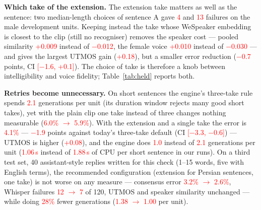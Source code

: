 \documentclass[conference]{IEEEtran}
\newcommand{\RES}[1]{\textcolor{red}{#1}}
\begin{document}
\textbf{Which take of the extension.} The extension take matters as well as the sentence: two
median-length choices of sentence A gave \RES{4} and \RES{13} failures on the male development units. Keeping
instead the take whose WeSpeaker embedding is closest to the clip (still no recogniser) removes the speaker
cost --- pooled similarity \RES{+0.009} instead of \RES{$-$0.012}, the female voice \RES{+0.010} instead of
\RES{$-$0.030} --- and gives the largest UTMOS gain (\RES{+0.18}), but a smaller error reduction
(\RES{$-$0.7} points, CI \RES{[$-$1.6, +0.1]}). The choice of take is therefore a knob between intelligibility
and voice fidelity; Table~\ref{tab:held} reports both.

\textbf{Retries become unnecessary.} On short sentences the engine's three-take rule spends \RES{2.1}
generations per unit (its duration window rejects many good short takes), yet with the plain clip one take
instead of three changes nothing measurable (\RES{6.0\% $\to$ 5.9\%}). With the extension and a single take
the error is \RES{4.1\%} --- \RES{$-$1.9} points against today's three-take default (CI \RES{[$-$3.3,
$-$0.6]}) --- UTMOS is higher (\RES{+0.08}), and the engine does \RES{1.0} instead of \RES{2.1} generations per
unit (\RES{1.06\,s} instead of \RES{1.88\,s} of CPU per short sentence in our runs). On a third test set,
40 assistant-style replies written for this check (1--15 words, five with English terms), the recommended
configuration (extension for Persian sentences, one take) is not worse on any measure --- consensus error
\RES{3.2\% $\to$ 2.6\%}, Whisper failures \RES{12 $\to$ 7} of 120, UTMOS and speaker similarity unchanged ---
while doing \RES{28\%} fewer generations (\RES{1.38 $\to$ 1.00} per unit).
\end{document}
